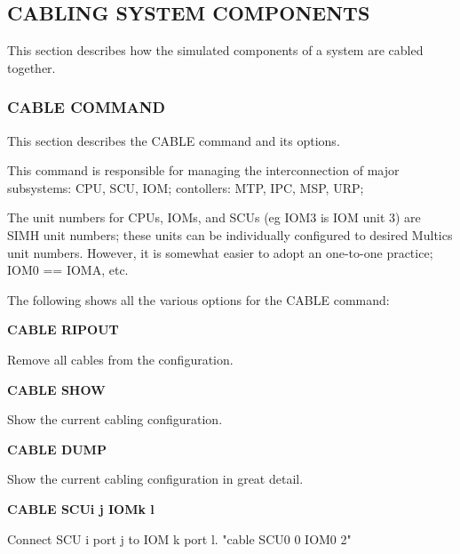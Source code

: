 
\subsection[Cabling System Components]{CABLING SYSTEM COMPONENTS}

This section describes how the simulated components of a system are cabled together.

\subsubsection[CABLE Command]{CABLE COMMAND}

This section describes the CABLE command and its options.

This command is responsible for managing the interconnection of
major subsystems: CPU, SCU, IOM; contollers: MTP, IPC, MSP, URP;

The unit numbers for CPUs, IOMs, and SCUs (eg IOM3 is IOM unit 3) are
SIMH unit numbers; these units can be individually configured to
desired Multics unit numbers. However, it is somewhat easier to
adopt an one-to-one practice; IOM0 == IOMA, etc.

The following shows all the various options for the CABLE command:

\textbf{CABLE RIPOUT}

\begin{adjustwidth}{5ex}{1ex}
  Remove all cables from the configuration.
\end{adjustwidth}

\textbf{CABLE SHOW}

\begin{adjustwidth}{5ex}{1ex}
  Show the current cabling configuration.
\end{adjustwidth}

\textbf{CABLE DUMP}

\begin{adjustwidth}{5ex}{1ex}
  Show the current cabling configuration in great detail.
\end{adjustwidth}

\textbf{CABLE SCUi j IOMk l}

\begin{adjustwidth}{5ex}{1ex}
  Connect SCU i port j to IOM k port l.
  "cable SCU0 0 IOM0 2"
\end{adjustwidth}

